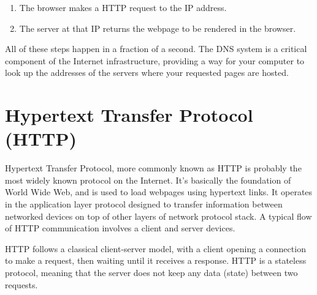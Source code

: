 \documentclass[12pt,titlepage]{article}
\begin{document}
\begin{enumerate}
    \item {
        The browser makes a HTTP request to the IP address.
        }
    \item {
        The server at that IP returns the webpage to be rendered in the browser.
    }
\end{enumerate}

All of these steps happen in a fraction of a second. The DNS system is a critical component of the Internet infrastructure, providing a way
for your computer to look up the addresses of the servers where your requested pages are hosted. \cite{cloudflare-dns}

\section{Hypertext Transfer Protocol (HTTP)}

Hypertext Transfer Protocol, more commonly known as HTTP is probably the most widely known protocol on the Internet. It's
basically the foundation of World Wide Web, and is used to load webpages using hypertext links. It operates in the application layer protocol
designed to transfer information between networked devices on top of other layers of network protocol stack.
A typical flow of HTTP communication involves a client and server devices.

HTTP follows a classical client-server model, with a client opening a connection to make a request,
then waiting until it receives a response. HTTP is a stateless protocol, meaning that the server does not
keep any data (state) between two requests. \cite{cloudflare-http}
\end{document}
